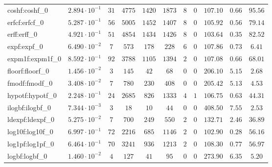 \begin{tabular}{|l|c|c|c|c|c|c|c|c|c|c|}
coshf:coshf\_0               & $ 2.894 \cdot 10^{-1} $ & $ 31     $ & $ 4775  $ & $ 1420  $ & $ 1873  $ & $ 8   $ & $ 0 $ & $ 107.10      $ & $ 0.66    $ & $ 95.56   $ \\
erfcf:erfcf\_0               & $ 5.287 \cdot 10^{-1} $ & $ 56     $ & $ 5005  $ & $ 1452  $ & $ 1407  $ & $ 8   $ & $ 0 $ & $ 105.92      $ & $ 0.56    $ & $ 79.14   $ \\
erff:erff\_0                 & $ 4.921 \cdot 10^{-1} $ & $ 51     $ & $ 4854  $ & $ 1434  $ & $ 1426  $ & $ 8   $ & $ 0 $ & $ 103.64      $ & $ 0.35    $ & $ 82.52   $ \\
expf:expf\_0                 & $ 6.490 \cdot 10^{-2} $ & $ 7      $ & $ 573   $ & $ 178   $ & $ 228   $ & $ 6   $ & $ 0 $ & $ 107.86      $ & $ 0.73    $ & $ 6.41    $ \\
expm1f:expm1f\_0             & $ 8.592 \cdot 10^{-1} $ & $ 92     $ & $ 3788  $ & $ 1105  $ & $ 1394  $ & $ 2   $ & $ 0 $ & $ 107.08      $ & $ 0.66    $ & $ 68.01   $ \\
floorf:floorf\_0             & $ 1.456 \cdot 10^{-2} $ & $ 3      $ & $ 145   $ & $ 42    $ & $ 68    $ & $ 0   $ & $ 0 $ & $ 206.10      $ & $ 5.15    $ & $ 2.68    $ \\
fmodf:fmodf\_0               & $ 3.408 \cdot 10^{-2} $ & $ 7      $ & $ 780   $ & $ 230   $ & $ 408   $ & $ 0   $ & $ 0 $ & $ 205.42      $ & $ 5.13    $ & $ 4.53    $ \\
hypotf:hypotf\_0             & $ 2.248 \cdot 10^{-1} $ & $ 24     $ & $ 2685  $ & $ 826   $ & $ 1333  $ & $ 4   $ & $ 1 $ & $ 106.75      $ & $ 0.63    $ & $ 44.31   $ \\
ilogbf:ilogbf\_0             & $ 7.344 \cdot 10^{-3} $ & $ 3      $ & $ 18    $ & $ 10    $ & $ 44    $ & $ 0   $ & $ 0 $ & $ 408.50      $ & $ 7.55    $ & $ 2.53    $ \\
ldexpf:ldexpf\_0             & $ 5.275 \cdot 10^{-2} $ & $ 7      $ & $ 700   $ & $ 249   $ & $ 550   $ & $ 2   $ & $ 0 $ & $ 132.71      $ & $ 2.46    $ & $ 36.89   $ \\
log10f:log10f\_0             & $ 6.997 \cdot 10^{-1} $ & $ 72     $ & $ 2216  $ & $ 685   $ & $ 1146  $ & $ 2   $ & $ 0 $ & $ 102.90      $ & $ 0.28    $ & $ 56.16   $ \\
log1pf:log1pf\_0             & $ 6.464 \cdot 10^{-1} $ & $ 70     $ & $ 3241  $ & $ 936   $ & $ 1213  $ & $ 2   $ & $ 0 $ & $ 108.30      $ & $ 0.77    $ & $ 56.97   $ \\
logbf:logbf\_0               & $ 1.460 \cdot 10^{-2} $ & $ 4      $ & $ 127   $ & $ 41    $ & $ 95    $ & $ 0   $ & $ 0 $ & $ 273.90      $ & $ 6.35    $ & $ 5.20    $ \\

\end{tabular}
